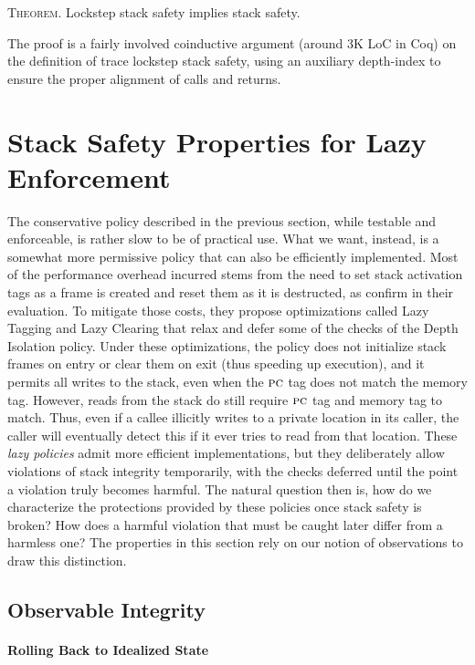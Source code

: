\documentclass[acmsmall,review,anonymous]{acmart}\settopmatter{printfolios=true,printccs=false,printacmref=false}
\begin{document}
{\medskip
\textsc{Theorem.}
Lockstep stack safety implies stack safety.
\smallskip

The proof is a fairly involved coinductive argument
(around 3K LoC in Coq) on the definition of trace lockstep stack safety,
using an auxiliary depth-index to ensure the proper alignment of
calls and returns.

\section{Stack Safety Properties for Lazy Enforcement}
\label{sec:lazy}

The conservative policy described in the previous section, while
testable and enforceable, is rather slow to be of practical use. What
we want, instead, is a somewhat more permissive policy that can also
be efficiently implemented. Most of the performance overhead incurred
stems from the need to set stack activation tags as a frame is created
and reset them as it is destructed, as
\citet{DBLP:conf/sp/RoesslerD18} confirm in their evaluation. To
mitigate those costs, they propose optimizations called Lazy Tagging and
Lazy Clearing that relax and defer some of the checks of the Depth Isolation
policy. Under these optimizations, the policy does not initialize stack
frames on entry or clear them on exit (thus speeding up execution),
and it permits all writes to the stack, even when the $\textsc{pc}$ tag
does not match the memory tag. 
However, reads from the stack do still require $\textsc{pc}$ tag and memory tag
to match. Thus, even if a callee illicitly writes to a private location
in its caller, the caller will eventually detect this if it ever tries to read from
that location.
%
These \emph{lazy policies} admit more efficient implementations, but
they deliberately allow violations of stack integrity temporarily,
with the checks deferred until the point a violation truly becomes
harmful. The natural question then is, how do we characterize the
protections provided by these policies once stack safety is broken?
How does a harmful violation that must be caught later differ from a
harmless one? The properties in this section rely on our notion of
observations to draw this distinction.

\subsection{Observable Integrity}

\paragraph{Rolling Back to Idealized State}

}
\end{document}
